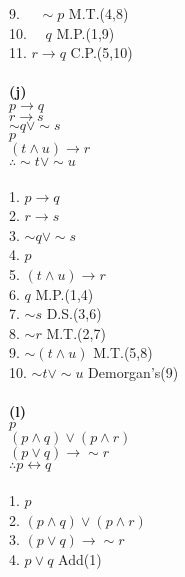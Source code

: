 \documentclass{article}
\begin{document}
9. $\quad \sim p $\hspace*{\fill} M.T.(4,8) \\
10. $\quad q $\hspace*{\fill} M.P.(1,9) \\
11. $r \rightarrow q$\hspace*{\fill} C.P.(5,10) \\ \\ 
\textbf{(j)} \\
$p \rightarrow q$ \\
$r \rightarrow s$ \\
$\sim q \vee \sim s$ \\
$p$ \\
\underline{$(t\wedge u) \rightarrow r$} \\
$\therefore \sim t \vee \sim u$ \\ \\ 
1. $p \rightarrow q$ \\
2. $r \rightarrow s$ \\
3. $\sim q \vee \sim s$ \\
4. $p$ \\
5. $(t\wedge u) \rightarrow r$ \\
6. $q$ \hspace*{\fill} M.P.(1,4) \\
7. $\sim s$ \hspace*{\fill} D.S.(3,6) \\
8. $\sim r$ \hspace*{\fill} M.T.(2,7) \\
9. $\sim (t \wedge u)$ \hspace*{\fill} M.T.(5,8) \\
10. $\sim t \vee \sim u$ \hspace*{\fill} Demorgan's(9) \\ \\ 
\textbf{(l)} \\
$p$ \\
$(p \wedge q) \vee (p \wedge r)$ \\
\underline{$(p \vee q) \rightarrow \sim r$} \\
$\therefore p \leftrightarrow q$  \\ \\
1. $p$ \\
2. $(p \wedge q) \vee (p \wedge r)$ \\
3. $(p \vee q) \rightarrow \sim r$ \\
4. $p \vee q$ \hspace*{\fill} Add(1)  \\
\end{document}
